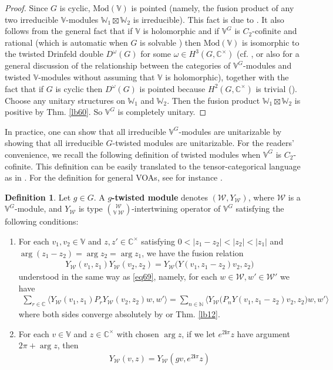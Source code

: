 \documentclass[11pt,b5paper,notitlepage]{article}
\theoremstyle{definition}
\newtheorem{df}{Definition}[section]
\theoremstyle{plain}
\newcommand{\mc}{\mathcal}
\newcommand{\bigbk}[1]{\big\langle {#1}\big\rangle}
\newcommand{\im}{\mathbf{i}}
\newcommand{\Vbb}{\mathbb V}
\newcommand{\Wbb}{\mathbb W}
\newcommand{\Cbb}{\mathbb C}
\newcommand{\Nbb}{\mathbb N}
\newcommand{\Mod}{\mathrm{Mod}}
\numberwithin{equation}{section}
\begin{document}
\begin{proof}
Since $G$ is cyclic, $\Mod(\Vbb)$ is pointed (namely, the fusion product of any two irreducible $\Vbb$-modules $\Wbb_1\boxtimes\Wbb_2$ is irreducible). This fact is due to \cite[Prop. 5.6]{vEMS20}. It also follows from the general fact that if $\Vbb$ is holomorphic and if $\Vbb^G$ is $C_2$-cofinite and rational (which is automatic when $G$ is solvable \cite{Miy15,CM16}) then $\Mod(\Vbb)$ is isomorphic to the twisted Drinfeld double $D^\omega(G)$ for some $\omega\in H^3(G,\Cbb^\times)$ (cf. \cite[Thm. 6.2]{DNR21},  or also \cite{Kir04,McR21} for a general discussion of the relationship between the categories of $\Vbb^G$-modules and twisted $\Vbb$-modules without assuming that $\Vbb$ is holomorphic), together with the fact that if $G$ is cyclic then $D^\omega(G)$ is pointed because $H^2(G,\Cbb^\times)$ is trivial (\cite[Cor. 3.6]{MN01}). Choose any unitary structures on $\Wbb_1$ and $\Wbb_2$. Then the fusion product $\Wbb_1\boxtimes\Wbb_2$ is positive by Thm. \ref{lb60}. So $\Vbb^G$ is completely unitary.
\end{proof}


In practice, one can show that all irreducible $\Vbb^G$-modules are unitarizable by showing that all irreducible $G$-twisted modules are unitarizable. For the readers' convenience, we recall the following definition of twisted modules when $\Vbb^G$ is $C_2$-cofinite. This definition can be easily translated to the tensor-categorical language as in \cite{Kir02,Kir04,McR21}. For the definition for general VOAs, see for instance \cite[Sec. 7]{DL96}.

\begin{df}
Let $g\in G$. A \textbf{$g$-twisted module} denotes $(\mc W,Y_{\mc W})$, where $\mc W$ is a $\Vbb^G$-module, and $Y_{\mc W}$ is type $\mc W\choose\Vbb~\mc W$-intertwining operator of $\Vbb^G$ satisfying the following conditions:
\begin{enumerate}[label=(\arabic*)]
\item For each $v_1,v_2\in\Vbb$ and $z,z'\in\Cbb^\times$ satisfying $0<|z_1-z_2|<|z_2|<|z_1|$ and $\arg(z_1-z_2)=\arg z_2=\arg z_1$, we have the fusion relation
\begin{align}
Y_{\mc W}(v_1,z_1)Y_{\mc W}(v_2,z_2)=Y_{\mc W}\big(Y(v_1,z_1-z_2)v_2,z_2 \big)
\end{align}
understood in the same way as \eqref{eq69}, namely, for each $w\in\mc W,w'\in\mc W'$ we have
\begin{align*}
\sum_{r\in\Cbb}\bigbk{Y_{\mc W}(v_1,z_1)P_rY_{\mc W}(v_2,z_2)w,w'}=\sum_{n\in\Nbb}\bigbk{Y_{\mc W}\big(P_nY(v_1,z_1-z_2)v_2,z_2 \big)w,w'}
\end{align*}
where both sides converge absolutely by \cite{Hua05} or Thm. \ref{lb12}.
\item For each $v\in\Vbb$ and $z\in\Cbb^\times$ with chosen $\arg z$, if we let $e^{2\im\pi}z$ have argument $2\pi+\arg z$, then
\begin{align}
Y_{\mc W}(v,z)=Y_{\mc W}(gv,e^{2\im\pi}z)  \label{eq88}
\end{align}
\end{enumerate}
\end{df}
\end{document}
